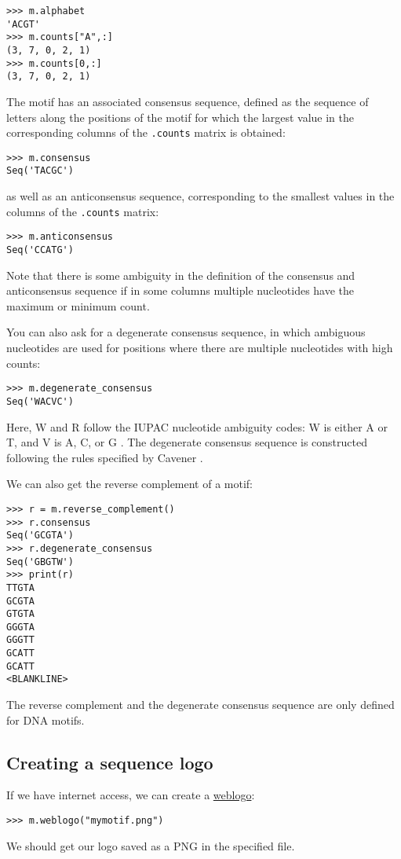 \begin{verbatim}
>>> m.alphabet
'ACGT'
>>> m.counts["A",:]
(3, 7, 0, 2, 1)
>>> m.counts[0,:]
(3, 7, 0, 2, 1)
\end{verbatim}
The motif has an associated consensus sequence, defined as the sequence of
letters along the positions of the motif for which the largest value in the
corresponding columns of the \verb+.counts+ matrix is obtained:

\begin{verbatim}
>>> m.consensus
Seq('TACGC')
\end{verbatim}
as well as an anticonsensus sequence, corresponding to the smallest values in
the columns of the \verb+.counts+ matrix:

\begin{verbatim}
>>> m.anticonsensus
Seq('CCATG')
\end{verbatim}
Note that there is some ambiguity in the definition of the consensus and anticonsensus sequence if in some columns multiple nucleotides have the maximum or minimum count.

You can also ask for a degenerate consensus sequence, in which ambiguous
nucleotides are used for positions where there are multiple nucleotides with
high counts:

\begin{verbatim}
>>> m.degenerate_consensus
Seq('WACVC')
\end{verbatim}
Here, W and R follow the IUPAC nucleotide ambiguity codes: W is either A or T,
and V is A, C, or G \cite{cornish1985}. The degenerate consensus sequence is
constructed following the rules specified by Cavener \cite{cavener1987}.

We can also get the reverse complement of a motif:

\begin{verbatim}
>>> r = m.reverse_complement()
>>> r.consensus
Seq('GCGTA')
>>> r.degenerate_consensus
Seq('GBGTW')
>>> print(r)
TTGTA
GCGTA
GTGTA
GGGTA
GGGTT
GCATT
GCATT
<BLANKLINE>
\end{verbatim}

The reverse complement and the degenerate consensus sequence are
only defined for DNA motifs.

\subsection{Creating a sequence logo}
If we have internet access, we can create a \href{https://weblogo.berkeley.edu}{weblogo}:
\begin{verbatim}
>>> m.weblogo("mymotif.png")
\end{verbatim}
We should get our logo saved as a PNG in the specified file.

